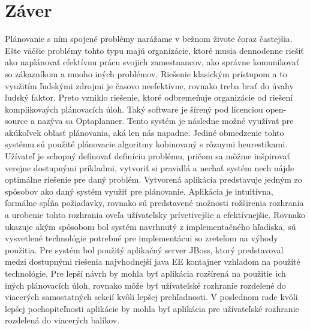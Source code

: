 \chapter{Záver}\label{zaver}
Plánovanie s ním spojené problémy narážame v bežnom živote čoraz častejšia. Ešte väčšie problémy tohto typu majú organizácie, ktoré musia dennodenne riešiť ako naplánovať efektívnu prácu svojich zamestnancov, ako správne komunikovať so zákazníkom a mnoho iných problémov. Riešenie klasickým prístupom a to využitím ľudskými zdrojmi je časovo neefektívne, rovnako treba brať do úvahy ľudský faktor. Preto vzniklo riešenie, ktoré odbremeňuje organizácie od riešení komplikovaých plánovacích úloh. Taký software je šírený pod licenciou open-source a nazýva sa Optaplanner. Tento systém je následne možné využívať pre akúkoľvek oblasť plánovania, aká len nás napadne. Jediné obmedzenie tohto systému sú použité plánovacie algoritmy kobinovaný s rôznymi heurestikami. Užívateľ je schopný definovať definíciu problému, pričom sa môžme inšpirovať verejne dostupnými príkladmi, vytvoriť si pravidlá a nechať systém nech nájde optimálne riešenie pre daný problém. Vytvorená aplikácia predstavuje jedným zo spôsobov ako daný systém využiť pre plánovanie. Aplikácia je intuitívna, formálne spĺňa požiadavky, rovnako sú predstavené možnosti rožširenia rozhrania a urobenie tohto rozhrania oveľa užívateľsky prívetivejšie a efektívnejšie.  Rovnako ukazuje akým spôsobom bol systém navrhnutý z implementačného hľadiska, sú vysvetlené technológie potrebné pre implementácui so zreteľom na výhody použitia. Pre systém bol použitý aplikačný server JBoss, ktorý predstavoval medzi dostupnými riešenia najvhodnejší java EE kontajner vzhľadom na použité technológie. Pre lepší návrh by mohla byť aplikácia rozšírená na použitie ich iných plánovacích úloh, rovnako môže byť užívateľské rozhranie rozdelené do viacerých samostatných sekcií kvôli lepšej prehľadnosti. V poslednom rade kvôli lepšej pochopiteľnosti aplikácie by mohla byť aplikácia pre užívateľské rozhranie rozdelená do viacerých balíkov.


